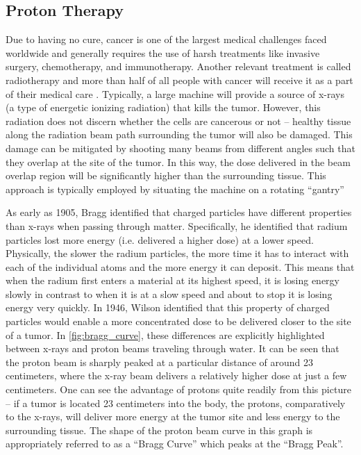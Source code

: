 \subsection{Proton Therapy}

Due to having no cure, cancer is one of the largest medical challenges faced worldwide and generally requires the use of harsh treatments like invasive surgery, chemotherapy, and immunotherapy. Another relevant treatment is called radiotherapy and more than half of all people with cancer will receive it as a part of their medical care \cite{Mayo_2024_Cancer}. Typically, a large machine will provide a source of x-rays (a type of energetic ionizing radiation) that kills the tumor. However, this radiation does not discern whether the cells are cancerous or not -- healthy tissue along the radiation beam path surrounding the tumor will also be damaged. This damage can be mitigated by shooting many beams from different angles such that they overlap at the site of the tumor. In this way, the dose delivered in the beam overlap region will be significantly higher than the surrounding tissue. This approach is typically employed by situating the machine on a rotating ``gantry''

As early as 1905, Bragg \cite{Bragg_1905_JOS} identified that charged particles have different properties than x-rays when passing through matter. Specifically, he identified that radium particles lost more energy (i.e. delivered a higher dose) at a lower speed. Physically, the slower the radium particles, the more time it has to interact with each of the individual atoms and the more energy it can deposit. This means that when the radium first enters a material at its highest speed, it is losing energy slowly in contrast to when it is at a slow speed and about to stop it is losing energy very quickly. In 1946, Wilson \cite{Wilson_1946_Rad} identified that this property of charged particles would enable a more concentrated dose to be delivered closer to the site of a tumor. In \autoref{fig:bragg_curve}, these differences are explicitly highlighted between x-rays and proton beams traveling through water. It can be seen that the proton beam is sharply peaked at a particular distance of around 23 centimeters, where the x-ray beam delivers a relatively higher dose at just a few centimeters. One can see the advantage of protons quite readily from this picture -- if a tumor is located 23 centimeters into the body, the protons, comparatively to the x-rays, will deliver more energy at the tumor site and less energy to the surrounding tissue. The shape of the proton beam curve in this graph is appropriately referred to as a ``Bragg Curve'' which peaks at the ``Bragg Peak''. 

